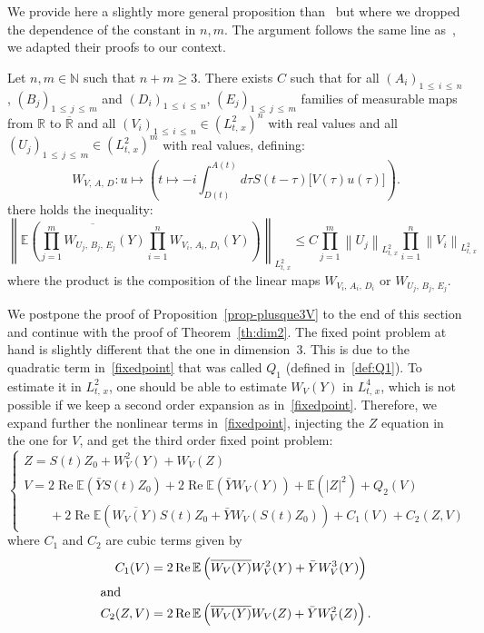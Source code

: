 \documentclass[10pt]{amsart}
\theoremstyle{definition}\newtheorem{defi}[theo]{Definition}\newtheorem{rema}[theo]{Remark}\newtheorem{exam}[theo]{Example}\newtheorem{exem}[theo]{Example}\newtheorem{nota}[theo]{Notation}
\newcommand{\R}{\mathbb{R}}
\newcommand{\N}{\mathbb{N}}
\newcommand{\E}{\mathbb{E}}
\DeclareMathOperator{\re}{Re}
\newcommand{\barR}{\overline{\R}}
\begin{document}
We provide here a slightly more general proposition than~\cite[Lemma~3]{lewsab2} but where we dropped the dependence of the constant in $n,m$. The argument follows the same line as~\cite{FLLS,lewsab2}, we adapted their proofs to our context.



\begin{prop}\label{prop-plusque3V}
Let $n,m\in \N$ such that $n+m \geq 3$. There exists $C$ such that for all $(A_i)_{1\,\leq\,i\,\leq\,n}$, $(B_j)_{1\,\leq\,j\,\leq\,m}$ and $(D_i)_{1\,\leq\,i\,\leq\, n}$, $(E_j)_{1\,\leq\,j\,\leq\,m}$ families of measurable maps from $\R$ to $\barR$ and all $(V_i)_{1\,\leq\,i\,\leq\,n} \in (L^2_{t,\,x})^n$ with real values and all $(U_j)_{1\,\leq\,j\,\leq\,m} \in (L^2_{t,\,x})^m$ with real values, defining:
\[
W_{V,\,A,\,D} : u \mapsto \left(t\mapsto -i\int_{D(t)}^{A(t)} d\tau S(t-\tau)\big[V(\tau) u(\tau)\big] \right).
\]
there holds the inequality:
\[
\left\|\E \left(\overline{\prod_{j=1}^m W_{U_j,\,B_j,\,E_j} (Y)} \prod_{i=1}^n W_{V_i,\,A_i,\,D_i}(Y)\right)\right\|_{L^2_{t,\,x}} \leq C \prod_{j=1}^m \left\|U_j\right\|_{L^2_{t,\,x}}\prod_{i=1}^n \left\|V_i\right\|_{L^2_{t,\,x}}
\]
where the product is the composition of the linear maps $W_{V_i,\,A_i,\,D_i}$ or $W_{U_j,\,B_j,\,E_j}$.
\end{prop}


We postpone the proof of Proposition~\ref{prop-plusque3V} to the end of this section and continue with the proof of Theorem~\ref{th:dim2}. The fixed point problem at hand is slightly different that the one in dimension~3. This is due to the quadratic term in~\eqref{fixedpoint} that was called $Q_1$ (defined in~\eqref{def:Q1}). To estimate it in $L^2_{t,\,x}$, one should be able to estimate $W_V(Y)$ in $L^4_{t,\,x}$, which is not possible if we keep a second order expansion as in~\eqref{fixedpoint}. Therefore, we expand further the nonlinear terms in~\eqref{fixedpoint}, injecting the $Z$ equation in the one for $V$, and get the third order fixed point problem:
\begin{equation}\label{fixpointdim2}
\begin{cases}
Z = S(t)Z_0 + W_V^2(Y) + W_V(Z) \\
V = 2\re \E\left(\bar Y S(t) Z_0\right) + 2\re\E \left(\bar Y W_V(Y)\right) + \E\left(|Z|^2\right) + Q_2(V) \\
\qquad + 2\re \E \left(\overline{W_V(Y)} S(t) Z_0 + \bar Y W_V\left(S(t) Z_0\right)\right) + C_1(V) + C_2(Z,V)
\end{cases}
\end{equation}
where $C_1$ and $C_2$ are cubic terms given by
\begin{align*}
C_1(V) &= 2\re \E\left(\overline{W_V(Y)} W_V^2(Y)+ \bar Y W_V^3(Y)\right)
\\
\intertext{and}
C_2(Z,V) &= 2\re \E\left(\overline{W_V(Y)} W_V(Z) + \bar Y W_V^2(Z) \right).
\end{align*}
\end{document}
